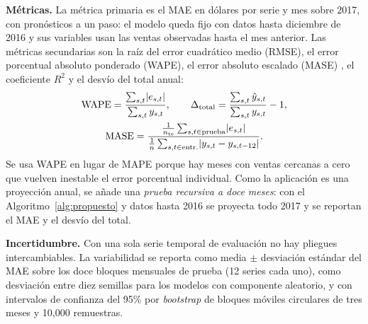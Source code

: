 \documentclass[pdflatex,sn-mathphys-num]{sn-jnl}
\begin{document}
\textbf{Métricas.} La métrica primaria es el MAE en dólares por serie y mes sobre 2017, con pronósticos a un paso: el modelo queda fijo con datos hasta diciembre de 2016 y sus variables usan las ventas observadas hasta el mes anterior. Las métricas secundarias son la raíz del error cuadrático medio (RMSE), el error porcentual absoluto ponderado (WAPE), el error absoluto escalado (MASE) \cite{hyndman2006}, el coeficiente $R^2$ y el desvío del total anual:
\begin{gather}
\mathrm{WAPE}=\frac{\sum_{s,t}\lvert e_{s,t}\rvert}{\sum_{s,t}y_{s,t}},\qquad
\Delta_{\mathrm{total}}=\frac{\sum_{s,t}\hat{y}_{s,t}}{\sum_{s,t}y_{s,t}}-1,\notag\\
\mathrm{MASE}=\frac{\frac{1}{n_{\mathrm{te}}}\sum_{s,t\in\mathrm{prueba}}\lvert e_{s,t}\rvert}{\frac{1}{n}\sum_{s,t\in\mathrm{entr.}}\lvert y_{s,t}-y_{s,t-12}\rvert}.
\label{eq:metricas}
\end{gather}
Se usa WAPE en lugar de MAPE porque hay meses con ventas cercanas a cero que vuelven inestable el error porcentual individual. Como la aplicación es una proyección anual, se añade una \emph{prueba recursiva a doce meses}: con el Algoritmo~\ref{alg:propuesto} y datos hasta 2016 se proyecta todo 2017 y se reportan el MAE y el desvío del total.

\textbf{Incertidumbre.} Con una sola serie temporal de evaluación no hay pliegues intercambiables. La variabilidad se reporta como media $\pm$ desviación estándar del MAE sobre los doce bloques mensuales de prueba (12 series cada uno), como desviación entre diez semillas para los modelos con componente aleatorio, y con intervalos de confianza del 95\% por \emph{bootstrap} de bloques móviles circulares \cite{kunsch1989} de tres meses y 10{,}000 remuestras.
\end{document}
